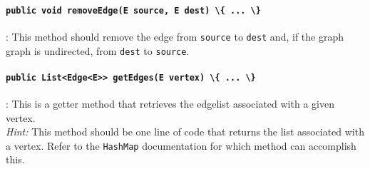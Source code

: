 \paragraph{\lstinline|public void removeEdge(E source, E dest) \{ ... \}|}: 
This method should remove the edge from \lstinline|source| to \lstinline|dest|
and, if the graph graph is undirected, from \lstinline|dest| to \lstinline|source|.

\paragraph{\lstinline|public List<Edge<E>> getEdges(E vertex) \{ ... \}|}: This
is a getter method that retrieves the edgelist associated with a given vertex.\\

\noindent\textit{Hint:} This method should be one line of code that returns the
list associated with a vertex. Refer to the \lstinline|HashMap| documentation
for which method can accomplish this.

